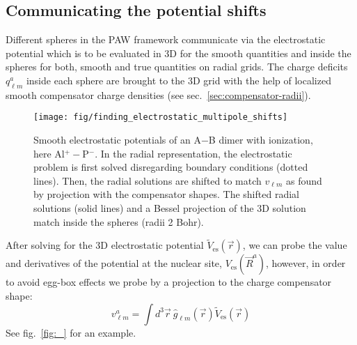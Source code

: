 \documentclass[oribibl]{llncs}
\newcommand{\um}[1]{_{\mathrm{#1}}}
\begin{document}
\subsection{Communicating the potential shifts} \label{sec:multipole-shifts}
Different spheres in the PAW framework communicate via the electrostatic
potential which is to be evaluated in 3D for the smooth quantities
and inside the spheres for both, smooth and true quantities on radial grids.
The charge deficits $q^a_{\ell m}$ inside each sphere are
brought to the 3D grid with the help of localized smooth compensator charge densities 
(see sec.~\ref{sec:compensator-radii}).
%
\begin{figure}
  \begin{minipage}[c]{.990\textwidth}
	\texttt{[image: fig/finding\_electrostatic\_multipole\_shifts]} %
  \end{minipage}\hfill
  \begin{minipage}[c]{.009\textwidth}
  \end{minipage}
  \label{fig:multipole-shifts}
  \caption{Smooth electrostatic potentials of an A$-$B dimer with ionization, here Al$^+ -$P$^-$.
  In the radial representation, the electrostatic problem is first solved disregarding boundary conditions (dotted lines).
  Then, the radial solutions are shifted to match $v_{\ell m}$ as found by projection with the compensator shapes.
  The shifted radial solutions (solid lines) and a Bessel projection of the 3D solution match inside the spheres (radii 2 Bohr).}
\end{figure}
%
%
After solving for the 3D electrostatic potential $\tilde V\um{es}(\vec r)$,
we can probe the value and derivatives of the potential at the nuclear site, $V\um{es}(\vec R^a)$,
however, in order to avoid egg-box effects we
probe by a projection to the charge compensator shape:
$$ v^a_{\ell m} = \int d^3 \vec r \  \hat g_{\ell m}(\vec r) \tilde V\um{es}(\vec r) $$
See fig.~\ref{fig:_} for an example.
\end{document}
